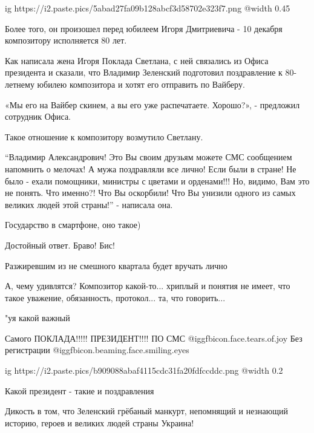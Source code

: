 \begin{multicols}{2}
\setlength{\parindent}{0pt}

\ifcmt
  ig https://i2.paste.pics/5abad27fa09b128abcf3d58702e323f7.png
  @width 0.45
\fi


Более того, он произошел перед юбилеем Игоря Дмитриевича - 10 декабря
композитору исполняется 80 лет.

Как написала жена Игоря Поклада Светлана, с ней связались из Офиса президента и
сказали, что Владимир Зеленский подготовил поздравление к 80-летнему юбилею
композитора и хотят его отправить по Вайберу.

«Мы его на Вайбер скинем, а вы его уже распечатаете. Хорошо?», - предложил
сотрудник Офиса.

Такое отношение к композитору возмутило Светлану.

\enquote{Владимир Александрович! Это Вы своим друзьям можете СМС сообщением напомнить о
мелочах! А мужа поздравляли все лично! Если были в стране! Не было - ехали
помощники, министры с цветами и орденами!!! Но, видимо, Вам это не понять. Что
именно?! Что Вы оскорбили! Что Вы унизили одного из самых великих людей этой
страны!} - написала она.


Государство в смартфоне, оно такое)

Достойный ответ. Браво! Бис!


Разжиревшим из не смешного квартала будет вручать лично


А, чему удивлятся? Композитор какой-то... хриплый и понятия не имеет, что такое
уважение, обязанность, протокол... та, что говорить...

"уя какой важный

Самого ПОКЛАДА!!!!! ПРЕЗИДЕНТ!!!! ПО СМС @igg{fbicon.face.tears.of.joy}  
Без регистрации  @igg{fbicon.beaming.face.smiling.eyes} 

\ifcmt
  ig https://i2.paste.pics/b909088abaf4115cdc31fa20fdfccddc.png
  @width 0.2
\fi

Какой президент - такие и поздравления

Дикость в том, что Зеленский грёбаный манкурт, непомнящий и незнающий историю,
героев и великих людей страны Украина!


\end{multicols}
